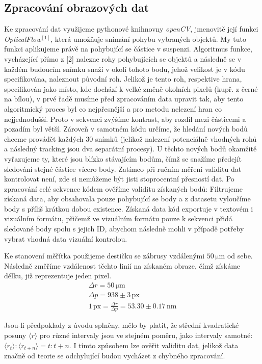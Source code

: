 \documentclass[czech,11pt,a4paper]{article}
\begin{document}
\begin{multicols}{2}
		\subsection{Zpracování obrazových dat}
		Ke zpracování dat využijeme pythonové knihnovny \textit{openCV}, jmenovitě její funkci \textit{OpticalFlow}$^{[1]}$, která umožňuje snímání pohybu vybraných objektů. My tuto funkci aplikujeme právě na pohybující se částice v suspenzi. Algoritmus funkce, vycházející přímo z [2] nalezne rohy pohybujících se objektů a následně se v každém budoucím snímku snaží v okolí tohoto bodu, jehož velikost je v kódu specifikována, naleznout původní roh. Jelikož je tento roh, respektive hrana, specifikován jako místo, kde dochází k velké změně okolních pixelů (kupř. z černé na bílou), v prvé řadě musíme před zpracováním data upravit tak, aby tento algoritmický proces byl co nejpřesnější a pro metodu nelezení hran co nejjednodušší. Proto v sekvenci zvýšíme kontrast, aby rozdíl mezi částicemi a pozadím byl větší. Zároveň v samotném kódu určíme, že hledání nových bodů chceme provádět každých 30 snímků (jelikož nalezení potenciálně vhodných rohů a následný tracking jsou dva separátní procesy). U těchto nových bodů okamžitě vyřazujeme ty, které jsou blízko stávajícím bodům, čímž se snažíme předejít sledování stejné částice vícero body. 
		Zatímco při ručním měření validitu dat kontrolovat není, zde si nemůžeme být jisti stoprocentní přesností dat.
		Po zpracování celé sekvence kódem ověříme validitu získaných bodů: Filtrujeme získaná data, aby obsahovala pouze pohybující se body a z datasetu vyloučíme body s příliš krátkou dobou existence. Získaná data kód exportuje v textovém i vizuálním formátu, přičemž ve vizuálním formátu pouze k sekvenci přidá sledované body spolu s jejich ID, abychom následně mohli v případě potřeby vybrat vhodná data vizuální kontrolou.
		
		Ke stanovení měřítka použijeme destičku se zábrusy vzdálenými $50 \,\mathrm{\mu m}$ od sebe. Následně změříme vzdálenost těchto linií na získaném obraze, čímž získáme délku, již reprezentuje jeden pixel.
		\begin{gather*}
			\Delta r = 50 \,\mathrm{\mu m}\\
			\Delta p = 938 \pm 3 \,\mathrm{px}\\
			1 \,\mathrm{px} = \frac{\Delta r}{\Delta p} = 53.30 \pm 0.17 \,\mathrm{nm}
		\end{gather*}
		
		Jsou-li předpoklady z úvodu splněny, mělo by platit, že střední kvadratické posuny $\langle r \rangle$ pro různé intervaly jsou ve stejném poměru, jako intervaly samotné: $\langle r_t \rangle: \langle r_{t+n} \rangle = t : t+n$. I tímto způsobem lze ověřit validitu dat, jelikož data značně od teorie se odchylující budou vycházet z chybného zpracování.

\end{multicols}
\end{document}
